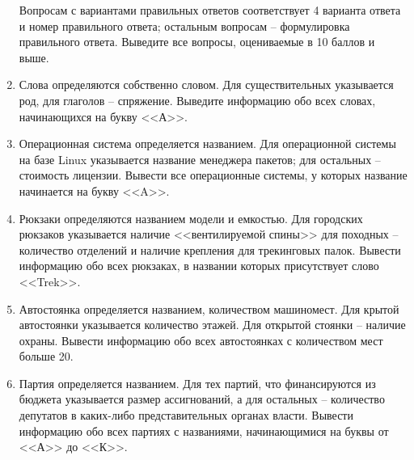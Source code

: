 \begin{enumerate}
Вопросам с вариантами правильных ответов соответствует 4 варианта ответа и номер правильного ответа;
остальным вопросам -- формулировка правильного ответа. Выведите все вопросы, оцениваемые в 10 баллов и выше.
\item Слова определяются собственно словом. Для существительных указывается род, для глаголов --
спряжение. Выведите информацию обо всех словах, начинающихся на букву <<А>>.
\item Операционная система определяется названием. Для операционной системы на базе Linux указывается
название менеджера пакетов; для остальных -- стоимость лицензии. Вывести все операционные системы, у которых название
начинается на букву <<A>>.
\item Рюкзаки определяются названием модели и емкостью. Для городских рюкзаков указывается наличие <<вентилируемой
спины>> для походных -- количество отделений и наличие крепления для трекинговых палок. Вывести информацию обо
всех рюкзаках, в названии которых присутствует слово <<Trek>>. 
\item Автостоянка определяется названием, количеством машиномест. Для крытой автостоянки указывается 
количество этажей. Для открытой стоянки -- наличие охраны. Вывести информацию обо всех автостоянках с количеством мест больше 20.
\item Партия определяется названием. Для тех партий, что финансируются из бюджета указывается размер
ассигнований, а для остальных -- количество депутатов в каких-либо представительных органах власти. Вывести
информацию обо всех партиях с названиями, начинающимися на буквы от <<А>> до <<К>>.
\end{enumerate}

